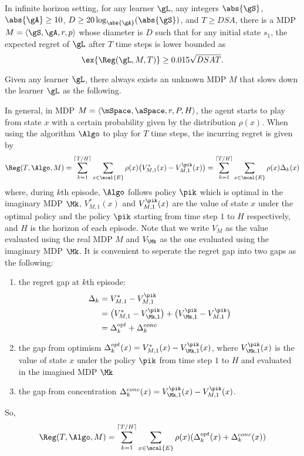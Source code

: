 \begin{prop}
    \label{prop:minimax_rg_lb}
    In infinite horizon setting, for any learner $\gL$, any integers $\abs{\gS}$, $\abs{\gA}\ge10$, $D\ge 20\log_{\abs{\gA}}(\abs{\gS})$, and $T\ge DSA$, there is a MDP $M=\langle\gS,\gA,r,p\rangle$ whose diameter is $D$ such that for any initial state $s_1$, the expected regret of $\gL$ after $T$ time steps is lower bounded as
    \begin{equation}
        \label{eq:minimax_rg_lb}
        \ex{\Reg(\gL, M, T)} \ge 0.015\sqrt{DSAT}.
    \end{equation}
\end{prop}



Given any learner $\gL$, there always exists an unknown MDP $M$ that slows down the learner $\gL$ as the following.

    In general, in MDP $M=\langle\mSpace,\aSpace,r,P,H\rangle$, the agent starts to play from state $x$ with a certain probability given by the distribution $\rho(x)$. When using the algorithm $\Algo$ to play for $T$ time steps, the incurring regret is given by
    \begin{align}
        \Reg(T,\Algo,M)=\sum_{k=1}^{\lceil T/H\rceil}\sum_{x\in\mcal{E}}\rho(x)\big(V_{M,1}^*(x) -V_{M,1}^{\pik}(x)\big) =\sum_{k=1}^{\lceil T/H\rceil}\sum_{x\in\mcal{E}}\rho(x)\Delta_k(x)
    \end{align}
    where, during $k$th episode, $\Algo$ follows policy $\pik$ which is optimal in the imaginary MDP $\Mk$, $V^*_{M,1}(x)$ and $V_{M,1}^{\pik}(x)$ are the value of state $x$ under the optimal policy and the policy $\pik$ starting from time step $1$ to $H$ respectively, and $H$ is the horizon of each episode.
    Note that we write $V_M$ as the value evaluated using the real MDP $M$ and $V_{\Mk}$ as the one evaluated using the imaginary MDP $\Mk$. It is convenient to seperate the regret gap into two gaps as the following:
    \begin{enumerate}
        \item the regret gap at $k$th episode:
        \begin{align*}
        \Delta_k &=V_{M,1}^* -V_{M,1}^{\pik} \\
        &=\big(V^*_{M,1} -V^{\pik}_{\Mk,1}\big) +\big(V^{\pik}_{\Mk,1} -V_{M,1}^{\pik}\big) \\
        &=\Delta_k^{opt}+\Delta_k^{conc}
        \end{align*}
    \item the gap from optimism $\Delta_k^{opt}(x)=V^*_{M,1}(x) -V^{\pik}_{\Mk,1}(x)$, where $V^{\pik}_{\Mk,1}(x)$ is the value of state $x$ under the policy $\pik$ from time step $1$ to $H$ and evaluated in the imagined MDP $\Mk$
    \item the gap from concentration $\Delta_k^{conc}(x)=V^{\pik}_{\Mk,1}(x) -V_{M,1}^{\pik}(x)$.
    \end{enumerate}
    So,
    \begin{equation}
    \label{eq:eq_6}
    \Reg(T,\Algo,M)= \sum_{k=1}^{\lceil T/H\rceil}\sum_{x\in\mcal{E}}\rho(x)(\Delta_k^{opt}(x)+\Delta_k^{conc}(x))
    \end{equation}

